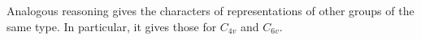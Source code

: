 Analogous reasoning gives the characters of representations of other groups of the same type.
In particular, it gives those for $C_{4v}$ and $C_{6v}$.
